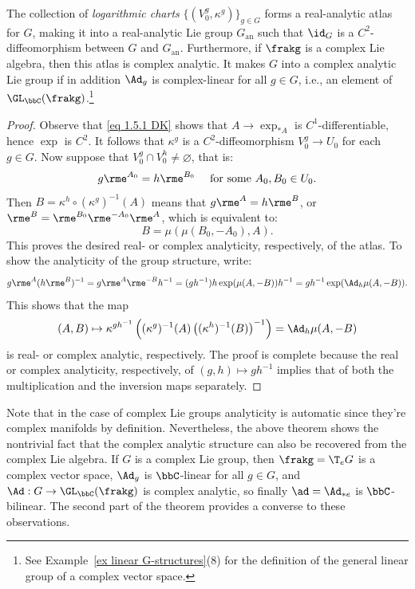 \begin{thm}[{{\cite[Thm.~1.6.3]{DK}}}]\label{thm 1.6.3 DK}
    The collection of \emph{logarithmic charts} $\{(V_0^g,\kappa^g)\}_{g\in G}$ forms a real-analytic atlas for $G$, making it into a real-analytic Lie group $G_{\mathrm{an}}$ such that $\id_G$ is a $C^2$-diffeomorphism between $G$ and $G_{\mathrm{an}}$. Furthermore, if $\frakg$ is a complex Lie algebra, then this atlas is complex analytic. It makes $G$ into a complex analytic Lie group if in addition $\Ad_g$ is complex-linear for all $g\in G$, i.e., an element of $\GL_\bbC(\frakg)$.\footnote{See Example~\ref{ex linear G-structures}(8) for the definition of the general linear group of a complex vector space.}
\end{thm}
\begin{proof}
    Observe that \eqref{eq 1.5.1 DK} shows that $A\to \exp_{\ast A}$ is $C^1$-differentiable, hence $\exp$ is $C^2$. It follows that $\kappa^g$ is a $C^2$-diffeomorphism $V^g_0\to U_0$ for each $g\in G$. Now suppose that $V_0^g\cap V^h_0\neq \varnothing$, that is:
    \[g \rme^{A_0}=h\rme^{B_0}\quad \text{ for some }A_0,B_0\in U_0.\]
    Then $B=\kappa^h\circ (\kappa^g)^{-1}(A)$ means that $g\rme^A=h\rme^B$, or $\rme^B=\rme^{B_0}\rme^{-A_0}\rme^A$, which is equivalent to:
    \[B=\mu(\mu(B_0,-A_0),A).\]
    This proves the desired real- or complex analyticity, respectively, of the atlas. To show the analyticity of the group structure, write:
    \[g \rme^A (h\rme^B)^{-1}=g\rme^A\rme^{-B}h^{-1}=(gh^{-1})h\exp(\mu(A,-B))h^{-1}=gh^{-1}\exp(\Ad_h\mu(A,-B)).\]
    This shows that the map 
    \[(A,B)\mapsto \kappa^{gh^{-1}}\left((\kappa^g)^{-1}(A)\left((\kappa^h)^{-1}(B)\right)^{-1}\right)=\Ad_h\mu(A,-B)\]
    is real- or complex analytic, respectively. The proof is complete because the real or complex analyticity, respectively, of $(g,h)\mapsto gh^{-1}$ implies that of both the multiplication and the inversion maps separately.
\end{proof}

\begin{rem}
    Note that in the case of complex Lie groups analyticity is automatic since they're complex manifolds by definition. Nevertheless, the above theorem shows the nontrivial fact that the complex analytic structure can also be recovered from the complex Lie algebra. If $G$ is a complex Lie group, then $\frakg=\T_e G$ is a complex vector space, $\Ad_g$ is $\bbC$-linear for all $g\in G$, and $\Ad:G\to \GL_\bbC(\frakg)$ is complex analytic, so finally $\ad=\Ad_{\ast e}$ is $\bbC$-bilinear. The second part of the theorem provides a converse to these observations.
\end{rem}


